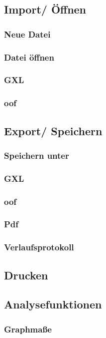 \documentclass[enabledeprecatedfontcommands,fontsize=11pt,paper=a4,twoside]{scrartcl}
\newcounter{one}
\begin{document}
	\subsection{Import/ Öffnen} \label{import}
		\subsubsection{Neue Datei}
		\subsubsection{Datei öffnen}
		\subsubsection{GXL}
		\subsubsection{oof}
	\subsection{Export/ Speichern} \label{export}
		\subsubsection{Speichern unter}
		\subsubsection{GXL}
		\subsubsection{oof}
		\subsubsection{Pdf}
		\subsubsection{Verlaufsprotokoll}
	\subsection{Drucken} \label{print}
	\subsection{Analysefunktionen} \label{analyse}
		\subsubsection{Graphmaße} 
\end{document}
